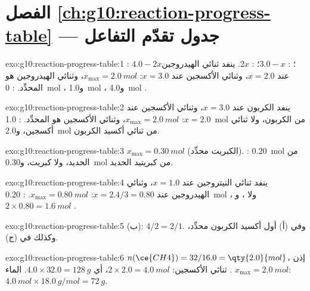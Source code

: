 \section*{الفصل \ref{ch:g10:reaction-progress-table} --- جدول تقدّم التفاعل}

\begin{solution}{exo:g10:reaction-progress-table:1}
: $4.0 - 2x$؛ : $3.0 - x$؛ : $2x$. ينفد ثنائي
الهيدروجين عند $x = 2.0$، وثنائي الأكسجين عند $x = 3.0$: $x_{\max} = \qty{2.0}{mol}$،
وثنائي الهيدروجين هو المحدِّد. : \qty{0}{mol} ،
و\qty{1.0}{mol} ، و\qty{4.0}{mol} .
\end{solution}

\begin{solution}{exo:g10:reaction-progress-table:2}
ينفد الكربون عند $x = 3.0$، وثنائي الأكسجين عند $x = 2.0$:
$x_{\max} = \qty{2.0}{mol}$، وثنائي الأكسجين هو المحدِّد. :
\qty{1.0}{mol} من الكربون، ولا ثنائي أكسجين، و\qty{2.0}{mol} من ثنائي أكسيد الكربون.
\end{solution}

\begin{solution}{exo:g10:reaction-progress-table:3}
$x_{\max} = \qty{0.30}{mol}$ (الكبريت محدِّد). :
\qty{0.20}{mol} من الحديد، ولا كبريت، و\qty{0.30}{mol} من كبريتيد الحديد.
\end{solution}

\begin{solution}{exo:g10:reaction-progress-table:4}
ينفد ثنائي النيتروجين عند $x = 1.0$، وثنائي الهيدروجين عند $x = 2.4/3 = 0.80$:
$x_{\max} = \qty{0.80}{mol}$. : \qty{0.20}{mol} ، ولا
، و$2 \times 0.80 = \qty{1.6}{mol}$ .
\end{solution}

\begin{solution}{exo:g10:reaction-progress-table:5}
(ب): $4/2 = 2/1$. وفي (أ) أول أكسيد الكربون محدِّد، وكذلك في (ج).
\end{solution}

\begin{solution}{exo:g10:reaction-progress-table:6}
$n(\ce{CH4}) = 32 / 16.0 = \qty{2.0}{mol}$، إذن $x_{\max} = \qty{2.0}{mol}$
. ثنائي الأكسجين: $2 \times 2.0 = \qty{4.0}{mol}$،
أي $4.0 \times 32.0 = \qty{128}{g}$. الماء:
$\qty{4.0}{mol} \times \qty{18.0}{g/mol} = \qty{72}{g}$.
\end{solution}

